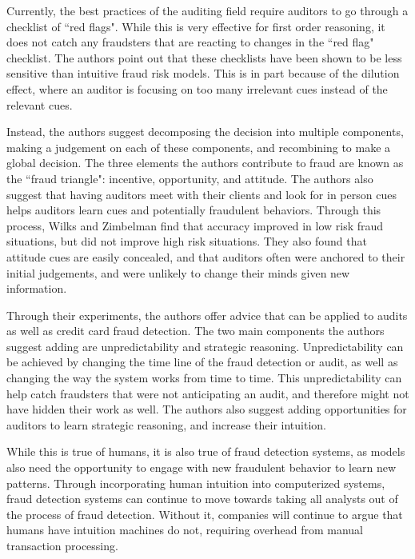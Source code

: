 \documentclass[midd]{thesis}
\begin{document}
Currently, the best practices of the auditing field require auditors to go through a checklist of ``red flags". While this is very effective for first order reasoning, it does not catch any fraudsters that are reacting to changes in the ``red flag" checklist. The authors point out that these checklists have been shown to be less sensitive than intuitive fraud risk models. This is in part because of the dilution effect, where an auditor is focusing on too many irrelevant cues instead of the relevant cues. 

Instead, the authors suggest decomposing the decision into multiple components, making a judgement on each of these components, and recombining to make a global decision. The three elements the authors contribute to fraud are known as the ``fraud triangle": incentive, opportunity, and attitude. The authors also suggest that having auditors meet with their clients and look for in person cues helps auditors learn cues and potentially fraudulent behaviors. Through this process, Wilks and Zimbelman find that accuracy improved in low risk fraud situations, but did not improve high risk situations. They also found that attitude cues are easily concealed, and that auditors often were anchored to their initial judgements, and were unlikely to change their minds given new information.

Through their experiments, the authors offer advice that can be applied to audits as well as credit card fraud detection. The two main components the authors suggest adding are unpredictability and strategic reasoning. Unpredictability can be achieved by changing the time line of the fraud detection or audit, as well as changing the way the system works from time to time. This unpredictability can help catch fraudsters that were not anticipating an audit, and therefore might not have hidden their work as well. The authors also suggest adding opportunities for auditors to learn strategic reasoning, and increase their intuition. 

While this is true of humans, it is also true of fraud detection systems, as models also need the opportunity to engage with new fraudulent behavior to learn new patterns. Through incorporating human intuition into computerized systems, fraud detection systems can continue to move towards taking all analysts out of the process of fraud detection. Without it, companies will continue to argue that humans have intuition machines do not, requiring overhead from manual transaction processing. 
\end{document}
